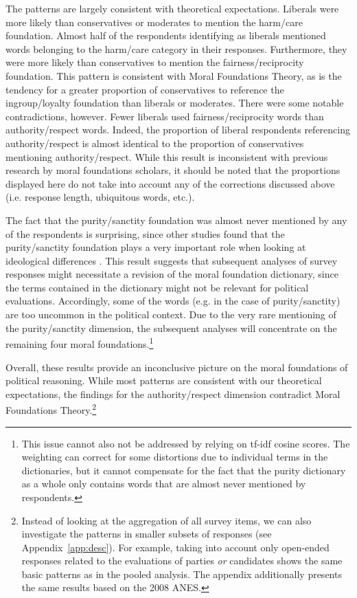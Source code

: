 \documentclass[12pt]{article}
\begin{document}
The patterns are largely consistent with theoretical expectations. Liberals were more likely than conservatives or moderates to mention the harm/care foundation. Almost half of the respondents identifying as liberals mentioned words belonging to the harm/care category in their responses. Furthermore, they were more likely than conservatives to mention the fairness/reciprocity foundation. This pattern is consistent with Moral Foundations Theory, as is the tendency for a greater proportion of conservatives to reference the ingroup/loyalty foundation than liberals or moderates. There were some notable contradictions, however. Fewer liberals used fairness/reciprocity words than authority/respect words. Indeed, the proportion of liberal respondents referencing authority/respect is almost identical to the proportion of conservatives mentioning authority/respect. While this result is inconsistent with previous research by moral foundations scholars, it should be noted that the proportions displayed here do not take into account any of the corrections discussed above (i.e. response length, ubiquitous words, etc.).

The fact that the purity/sanctity foundation was almost never mentioned by any of the respondents is surprising, since other studies found that the purity/sanctity foundation plays a very important role when looking at ideological differences \citep{koleva2012tracing}. This result suggests that subsequent analyses of survey responses might necessitate a revision of the moral foundation dictionary, since the terms contained in the dictionary might not be relevant for political evaluations. Accordingly, some of the words (e.g. in the case of purity/sanctity) are too uncommon in the political context. Due to the very rare mentioning of the purity/sanctity dimension, the subsequent analyses will concentrate on the remaining four moral foundations.\footnote{This issue cannot also not be addressed by relying on tf-idf cosine scores. The weighting can correct for some distortions due to individual terms in the dictionaries, but it cannot compensate for the fact that the purity dictionary as a whole only contains words that are almost never mentioned by respondents.}

Overall, these results provide an inconclusive picture on the moral foundations of political reasoning. While most patterns are consistent with our theoretical expectations, the findings for the authority/respect dimension contradict Moral Foundations Theory.\footnote{Instead of looking at the aggregation of all survey items, we can also investigate the patterns in smaller subsets of responses (see Appendix~\ref{app:desc}). For example, taking into account only open-ended responses related to the evaluations of parties \textit{or} candidates shows the same basic patterns as in the pooled analysis. The appendix additionally presents the same results based on the 2008 ANES.}
\end{document}
